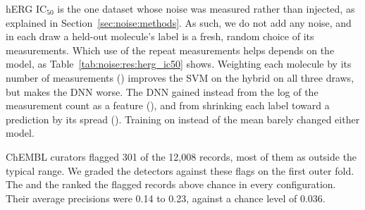 hERG IC$_{50}$ is the one dataset whose noise was measured rather than injected, as explained in Section~\ref{sec:noise:methods}. As such, we do not add any noise, and in each draw a held-out molecule's label is a fresh, random choice of its measurements. Which use of the repeat measurements helps depends on the model, as Table~\ref{tab:noise:res:herg_ic50} shows. Weighting each molecule by its number of measurements () improves the SVM on the hybrid on all three draws, but makes the DNN worse. The DNN gained instead from the log of the measurement count as a feature (), and from shrinking each label toward a prediction by its spread (). Training on  instead of the mean barely changed either model.

ChEMBL curators flagged 301 of the 12,008 records, most of them as outside the typical range. We graded the detectors against these flags on the first outer fold. The  and the  ranked the flagged records above chance in every configuration. Their average precisions were 0.14 to 0.23, against a chance level of 0.036.

